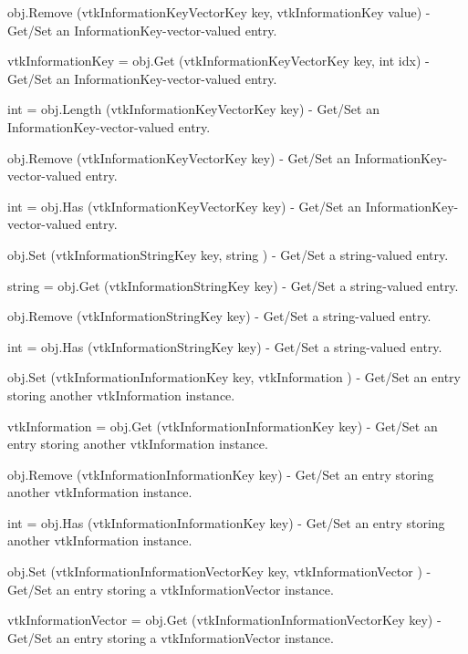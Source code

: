 \begin{DoxyItemize}
\item {\ttfamily obj.\-Remove (vtk\-Information\-Key\-Vector\-Key key, vtk\-Information\-Key value)} -\/ Get/\-Set an Information\-Key-\/vector-\/valued entry.  
\item {\ttfamily vtk\-Information\-Key = obj.\-Get (vtk\-Information\-Key\-Vector\-Key key, int idx)} -\/ Get/\-Set an Information\-Key-\/vector-\/valued entry.  
\item {\ttfamily int = obj.\-Length (vtk\-Information\-Key\-Vector\-Key key)} -\/ Get/\-Set an Information\-Key-\/vector-\/valued entry.  
\item {\ttfamily obj.\-Remove (vtk\-Information\-Key\-Vector\-Key key)} -\/ Get/\-Set an Information\-Key-\/vector-\/valued entry.  
\item {\ttfamily int = obj.\-Has (vtk\-Information\-Key\-Vector\-Key key)} -\/ Get/\-Set an Information\-Key-\/vector-\/valued entry.  
\item {\ttfamily obj.\-Set (vtk\-Information\-String\-Key key, string )} -\/ Get/\-Set a string-\/valued entry.  
\item {\ttfamily string = obj.\-Get (vtk\-Information\-String\-Key key)} -\/ Get/\-Set a string-\/valued entry.  
\item {\ttfamily obj.\-Remove (vtk\-Information\-String\-Key key)} -\/ Get/\-Set a string-\/valued entry.  
\item {\ttfamily int = obj.\-Has (vtk\-Information\-String\-Key key)} -\/ Get/\-Set a string-\/valued entry.  
\item {\ttfamily obj.\-Set (vtk\-Information\-Information\-Key key, vtk\-Information )} -\/ Get/\-Set an entry storing another vtk\-Information instance.  
\item {\ttfamily vtk\-Information = obj.\-Get (vtk\-Information\-Information\-Key key)} -\/ Get/\-Set an entry storing another vtk\-Information instance.  
\item {\ttfamily obj.\-Remove (vtk\-Information\-Information\-Key key)} -\/ Get/\-Set an entry storing another vtk\-Information instance.  
\item {\ttfamily int = obj.\-Has (vtk\-Information\-Information\-Key key)} -\/ Get/\-Set an entry storing another vtk\-Information instance.  
\item {\ttfamily obj.\-Set (vtk\-Information\-Information\-Vector\-Key key, vtk\-Information\-Vector )} -\/ Get/\-Set an entry storing a vtk\-Information\-Vector instance.  
\item {\ttfamily vtk\-Information\-Vector = obj.\-Get (vtk\-Information\-Information\-Vector\-Key key)} -\/ Get/\-Set an entry storing a vtk\-Information\-Vector instance.  

\end{DoxyItemize}
